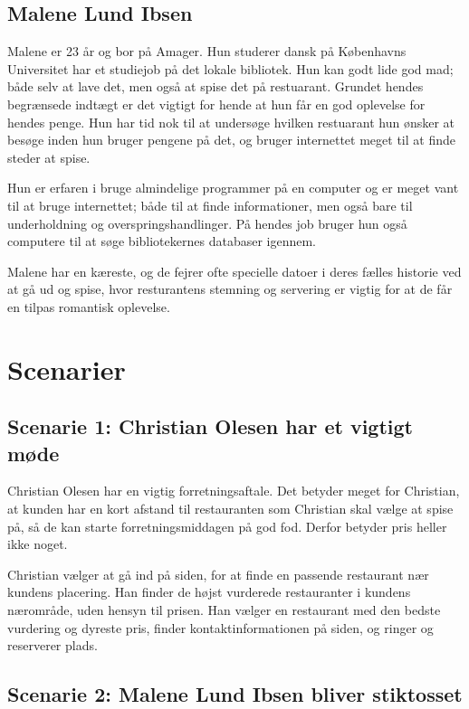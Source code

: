 \documentclass[a4paper, 12pt]{article}
\begin{document}
\subsection{Malene Lund Ibsen}
Malene er 23 år og bor på Amager. Hun studerer dansk på Københavns Universitet har et studiejob på det lokale bibliotek. Hun kan godt lide god mad; både selv at lave det, men også at spise det på restuarant. Grundet hendes begrænsede indtægt er det vigtigt for hende at hun får en god oplevelse for hendes penge. Hun har tid nok til at undersøge hvilken restuarant hun ønsker at besøge inden hun bruger pengene på det, og bruger internettet meget til at finde steder at spise.

Hun er erfaren i bruge almindelige programmer på en computer og er meget vant til at bruge internettet; både til at finde informationer, men også bare til underholdning og overspringshandlinger. På hendes job bruger hun også computere til at søge bibliotekernes databaser igennem. 

Malene har en kæreste, og de fejrer ofte specielle datoer i deres fælles historie ved at gå ud og spise, hvor resturantens stemning og servering er vigtig for at de får en tilpas romantisk oplevelse.


\section{Scenarier}
\label{sec:Scenarier}

\subsection{Scenarie 1: Christian Olesen har et vigtigt møde}
\label{sub:Scenarie 1: Christian Olesen}
Christian Olesen har en vigtig forretningsaftale. Det betyder meget for
Christian, at kunden har en kort afstand til restauranten som Christian skal
vælge at spise på, så de kan starte forretningsmiddagen på god fod. Derfor
betyder pris heller ikke noget.

Christian vælger at gå ind på siden, for at finde en passende restaurant nær
kundens placering. Han finder de højst vurderede restauranter i kundens
nærområde, uden hensyn til prisen. Han vælger en restaurant med den bedste
vurdering og dyreste pris, finder kontaktinformationen på siden, og ringer og
reserverer plads.

\subsection{Scenarie 2: Malene Lund Ibsen bliver stiktosset}
\label{sub:Scenarie 2: Malene Lund Ibsen}
\end{document}
